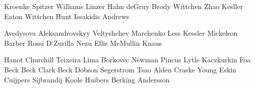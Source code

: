 





































Kroenke Spitzer Williams Linzer Hahn deGruy Brody 
Wittchen Zhao Kesller Eaton 
Wittchen 
Hunt Issakidis Andrews 


Avedysova Aleksandrovskyy 
Veltyshchev Marchenko 
Less 
Kessler Mickelson Barber Rossi 
D`Zurilla Nezu 
Ellis 
McMullin 
Knaus 

Hanot Churchill Teixeira Lima 
Borkovec Newman Pincus Lytle 
Kaczkurkin Foa 
Beck Beck 
Clark Beck 
Dobson 
Segerstrom Tsao Alden Craske 
Young 
Eskin 
Cuijpers Sijbrandij Koole Huibers Berking Andersson 

